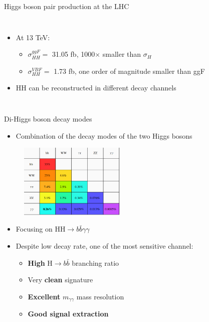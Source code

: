 \begin{frame}{Higgs boson pair production at the LHC}
\begin{columns}

\begin{itemize}
    \item At 13 TeV: 
    \begin{itemize}
        \item $\sigma^{ggF}_{HH} = $ 31.05 fb, 1000$\times$ smaller than $\sigma_{H}$
        \item $\sigma^{VBF}_{HH} = $ 1.73 fb, one order of magnitude smaller than ggF
    \end{itemize}
    \item HH can be reconstructed in different decay channels
\end{itemize}
\end{columns}
\end{frame}

\begin{frame}{Di-Higgs boson decay modes}

\begin{itemize}
    \item Combination of the decay modes of the two Higgs bosons
\end{itemize}
\begin{figure}
    \centering
    \includegraphics[width=0.45\textwidth]{Part1/Img/HH_decays.png}
\end{figure}
\begin{itemize}
    \item \textcolor{HHred}{Focusing on HH$\to b\bar{b}\gamma\gamma$}
    \item Despite low decay rate, one of the most sensitive channel:
    \begin{itemize}
        \item \textbf{High} H$\to b\bar{b}$ branching ratio
        \item Very \textbf{clean} signature
        \item \textbf{Excellent} $m_{\gamma\gamma}$ mass resolution
        \item \textbf{Good signal extraction}
    \end{itemize}
\end{itemize}

\end{frame}


